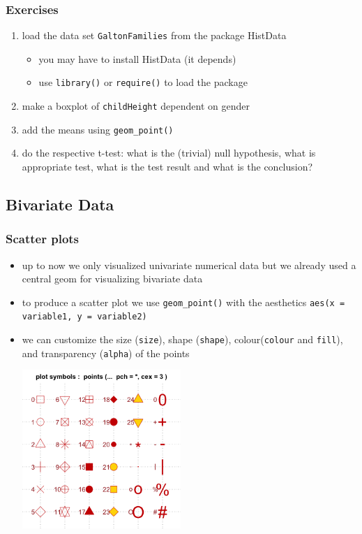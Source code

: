 \documentclass[xcolor={table}]{beamer}
\begin{document}
\begin{frame}[allowframebreaks]\frametitle{Exercises}
  \begin{enumerate}
  \item load the data set \texttt{GaltonFamilies} from the package HistData 
    \begin{itemize}
    \item you may have to install HistData (it depends)
    \item use \texttt{library()} or \texttt{require()} to load the package
    \end{itemize}
    \item make a boxplot of \texttt{childHeight} dependent on gender
    \item add the means using \texttt{geom\_point()}
    \item do the respective t-test: what is the (trivial) null hypothesis, what is appropriate test, what is the test result and what is the conclusion?
  \end{enumerate}
\end{frame}


\subsection{Bivariate Data}
\begin{frame}\frametitle{Scatter plots}
  \begin{itemize}
  \item up to now we only visualized univariate numerical data but we already used a central geom for visualizing bivariate data 
  \item to produce a scatter plot we use \texttt{geom\_point()} with the aesthetics \texttt{aes(x = variable1, y = variable2)}
  \item we can customize the size (\texttt{size}), shape (\texttt{shape}), colour(\texttt{colour} and \texttt{fill}), and transparency (\texttt{alpha}) of the points 
  \begin{center}
    \includegraphics[width=6cm]{shapes.png}
  \end{center}
  \end{itemize}
\end{frame}
\end{document}
